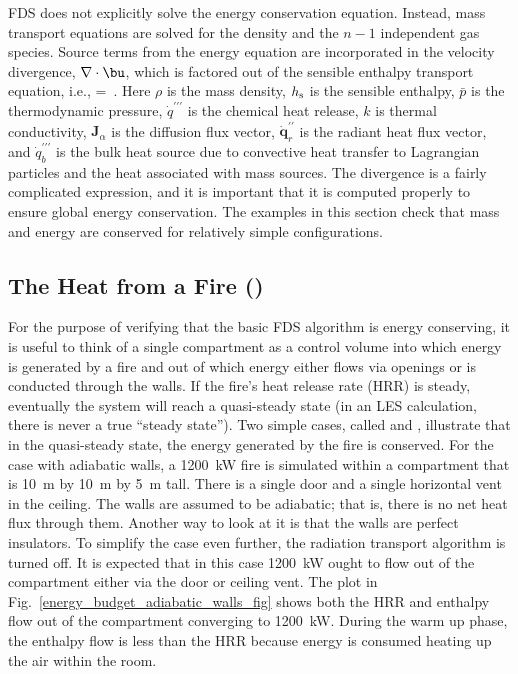 \documentclass[11pt]{book}
\begin{document}
FDS does not explicitly solve the energy conservation equation. Instead, mass transport equations are solved for the density and the $n-1$ independent gas species. Source terms from the energy equation are incorporated in the velocity  divergence, $\nabla \cdot \bu$, which is factored out of the sensible enthalpy transport equation, i.e.,
\be
\label{eqn_new_div}
\nabla\cdot{} =   \,\mbox{.}
\ee
Here $\rho$ is the mass density, $h_{\rm s}$ is the sensible enthalpy, $\bar{p}$ is the thermodynamic pressure, $\dot{q}^{\prime\prime\prime}$ is the chemical heat release, $k$ is thermal conductivity, $\mathbf{J}_\alpha$ is the diffusion flux vector, $\dot{\mathbf{q}}_r^{\prime\prime}$ is the radiant heat flux vector, and $\dot{q}_b^{\prime\prime\prime}$ is the bulk heat source due to convective heat transfer to Lagrangian particles and the heat associated with mass sources. The divergence is a fairly complicated expression, and it is important that it is computed properly to ensure global energy conservation. The examples in this section check that mass and energy are conserved for relatively simple configurations.

\subsection{The Heat from a Fire (\texorpdfstring{}{energy\_budget})}
\label{energy_budget_walls}
\label{energy_budget_adiabatic_walls}
\label{energy_budget_cold_walls}

For the purpose of verifying that the basic FDS algorithm is energy conserving, it is useful to think of a single compartment as a control volume into which energy is generated by a fire and out of which energy either flows via openings or is conducted through the walls. If the fire's heat release rate (HRR) is steady, eventually the system will reach a quasi-steady state (in an LES calculation, there is never a true ``steady state''). Two simple cases, called  and , illustrate that in the quasi-steady state, the energy generated by the fire is conserved. For the case with adiabatic walls, a 1200~kW fire is simulated within a compartment that is 10~m by 10~m by 5~m tall. There is a single door and a single horizontal vent in the ceiling. The walls are assumed to be adiabatic; that is, there is no net heat flux through them. Another way to look at it is that the walls are perfect insulators. To simplify the case even further, the radiation transport algorithm is turned off. It is expected that in this case 1200~kW ought to flow out of the compartment either via the door or ceiling vent. The plot in Fig.~\ref{energy_budget_adiabatic_walls_fig} shows both the HRR and enthalpy flow out of the compartment converging to 1200~kW. During the warm up phase, the enthalpy flow is less than the HRR because energy is consumed heating up the air within the room.
\end{document}
